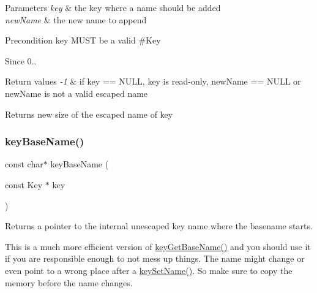 \begin{DoxyParams}{Parameters}
{\em key} & the key where a name should be added \\
\hline
{\em new\+Name} & the new name to append\\
\hline
\end{DoxyParams}
\begin{DoxyPrecond}{Precondition}
{\ttfamily key} M\+U\+ST be a valid \#\+Key
\end{DoxyPrecond}
\begin{DoxySince}{Since}
0..
\end{DoxySince}

\begin{DoxyRetVals}{Return values}
{\em -\/1} & if {\ttfamily key == N\+U\+LL}, {\ttfamily key} is read-\/only, {\ttfamily new\+Name == N\+U\+LL} or {\ttfamily new\+Name} is not a valid escaped name \\
\hline
\end{DoxyRetVals}
\begin{DoxyReturn}{Returns}
new size of the escaped name of {\ttfamily key} 
\end{DoxyReturn}
\mbox{\label{group__keyname_gaaff35e7ca8af5560c47e662ceb9465f5}} 
\subsubsection{\texorpdfstring{key\+Base\+Name()}{keyBaseName()}}
{\footnotesize\ttfamily const char$\ast$ key\+Base\+Name (\begin{DoxyParamCaption}\item[{const Key $\ast$}]{key }\end{DoxyParamCaption})}



Returns a pointer to the internal unescaped key name where the {\ttfamily basename} starts. 

This is a much more efficient version of \hyperlink{group__keyname_ga0992d26bcfca767cb8e77053a483eb64}{key\+Get\+Base\+Name()} and you should use it if you are responsible enough to not mess up things. The name might change or even point to a wrong place after a \hyperlink{group__keyname_ga7699091610e7f3f43d2949514a4b35d9}{key\+Set\+Name()}. So make sure to copy the memory before the name changes.

